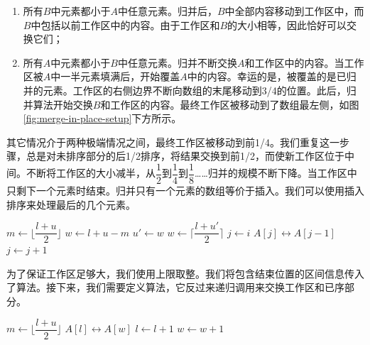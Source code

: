 \documentclass[b5paper]{ctexart}
\begin{document}
\begin{enumerate}
\item 所有$B$中元素都小于$A$中任意元素。归并后，$B$中全部内容移动到工作区中，而$B$中包括以前工作区中的内容。由于工作区和$B$的大小相等，因此恰好可以交换它们；
\item 所有$A$中元素都小于$B$中任意元素。归并不断交换$A$和工作区中的内容。当工作区被$A$中一半元素填满后，开始覆盖$A$中的内容。幸运的是，被覆盖的是已归并的元素。工作区的右侧边界不断向数组的末尾移动到3/4的位置。此后，归并算法开始交换$B$和工作区的内容。最终工作区被移动到了数组最左侧，如图\ref{fig:merge-in-place-setup}下方所示。
\end{enumerate}

其它情况介于两种极端情况之间，最终工作区被移动到前1/4。我们重复这一步骤，总是对未排序部分的后1/2排序，将结果交换到前1/2，而使新工作区位于中间。不断将工作区的大小减半，从$\dfrac{1}{2}$到$\dfrac{1}{4}$到$\dfrac{1}{8}$……归并的规模不断下降。当工作区中只剩下一个元素时结束。归并只有一个元素的数组等价于插入。我们可以使用插入排序来处理最后的几个元素。

\begin{algorithmic}[1]
    \State $m \gets \lfloor \dfrac{l + u}{2} \rfloor$
    \State $w \gets l + u - m$
    \State {} 
      \State $u' \gets w$
      \State $w \gets \lceil \dfrac{l + u'}{2} \rceil$ 
      \State {} 
      \State \Call{Merge}{$A, [l, l + u' - w), [u', u), w$}
    \EndWhile
     
      \State $j \gets i$
        \State {} $A[j] \leftrightarrow A[j-1]$
        \State $j \gets j + 1$
      \EndWhile
    \EndFor
  \EndIf
\EndProcedure
\end{algorithmic}

为了保证工作区足够大，我们使用上限取整。我们将包含结束位置的区间信息传入了算法。接下来，我们需要定义算法，它反过来递归调用来交换工作区和已序部分。

\begin{algorithmic}[1]
    \State $m \gets \lfloor \dfrac{l + u}{2} \rfloor$
    \State {}
    \State {}
    \State \Call{Merge}{$A, [l, m), [m+1, u), w$}
  \Else {}
      \State {} $A[l] \leftrightarrow A[w]$
      \State $l \gets l + 1$
      \State $w \gets w + 1$
    \EndWhile
  \EndIf
\EndProcedure
\end{algorithmic}
\end{document}
